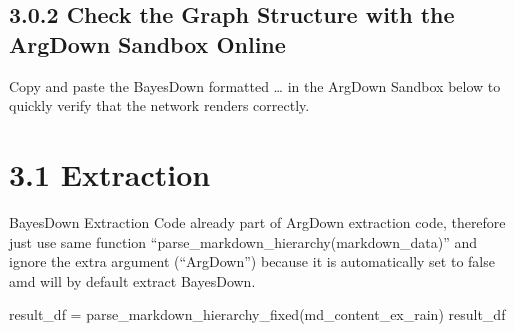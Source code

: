 \documentclass[
  11pt,
  letterpaper,
]{book}
\newenvironment{Shaded}{\begin{snugshade}}{\end{snugshade}}
\newcommand{\NormalTok}[1]{\textcolor[rgb]{0.00,0.23,0.31}{#1}}
\newcommand{\OperatorTok}[1]{\textcolor[rgb]{0.37,0.37,0.37}{#1}}
\begin{document}
\subsection{3.0.2 Check the Graph Structure with the ArgDown Sandbox
Online}\label{check-the-graph-structure-with-the-argdown-sandbox-online-1}

Copy and paste the BayesDown formatted \ldots{} in the ArgDown Sandbox
below to quickly verify that the network renders correctly.

\section{3.1 Extraction}\label{extraction}

BayesDown Extraction Code already part of ArgDown extraction code,
therefore just use same function
``parse\_markdown\_hierarchy(markdown\_data)'' and ignore the extra
argument (``ArgDown'') because it is automatically set to false amd will
by default extract BayesDown.

\begin{Shaded}
\begin{Highlighting}[]
\NormalTok{result\_df }\OperatorTok{=}\NormalTok{ parse\_markdown\_hierarchy\_fixed(md\_content\_ex\_rain)}
\NormalTok{result\_df}
\end{Highlighting}
\end{Shaded}
\end{document}
